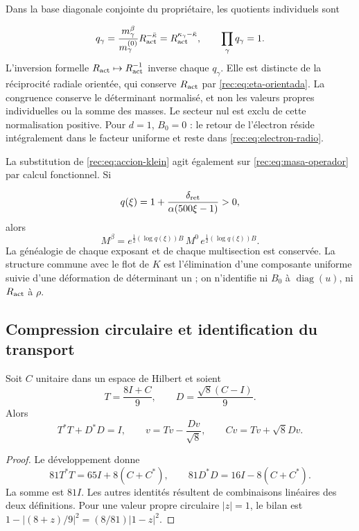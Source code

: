 Dans la base diagonale conjointe du propriétaire, les quotients individuels sont

\[
 q_\gamma=\frac{m_\gamma^\beta}{m_\gamma^{(0)}}R_{\rm act}^{-\bar\kappa}
 =R_{\rm act}^{\kappa_\gamma-\bar\kappa},\qquad
 \prod_\gamma q_\gamma=1.
\]
L’inversion formelle \(R_{\rm act}\mapsto R_{\rm act}^{-1}\) inverse chaque \(q_\gamma\). Elle est distincte de la réciprocité radiale orientée, qui conserve \(R_{\rm act}\) par \eqref{rec:eq:eta-orientada}. La congruence conserve le déterminant normalisé, et non les valeurs propres individuelles ou la somme des masses. Le secteur nul est exclu de cette normalisation positive. Pour \(d=1\), \(B_0=0\) : le retour de l’électron réside intégralement dans le facteur uniforme et reste dans \eqref{rec:eq:electron-radio}.

La substitution de \eqref{rec:eq:accion-klein} agit également sur \eqref{rec:eq:masa-operador} par calcul fonctionnel. Si

\[
 q(\xi)=1+\frac{\delta_{\rm ret}}{\alpha(500\xi-1)}>0,
\]
alors
\[
 M^\beta=e^{\frac12(\log q(\xi))B}\,M^0\,
          e^{\frac12(\log q(\xi))B}.
\]
La généalogie de chaque exposant et de chaque multisection est conservée. La structure commune avec le flot de \(K\) est l’élimination d’une composante uniforme suivie d’une déformation de déterminant un ; on n’identifie ni \(B_0\) à \(\operatorname{diag}(u)\), ni \(R_{\rm act}\) à \(\rho\).


\subsection{Compression circulaire et identification du transport}

\begin{theorem}
\label{rec:thm:operador}
Soit \(C\) unitaire dans un espace de Hilbert et soient
\[
 T=\frac{8I+C}{9},\qquad D=\frac{\sqrt8(C-I)}9.
\]
Alors
\begin{equation}
 T^*T+D^*D=I,\qquad
 v=Tv-\frac{Dv}{\sqrt8},\qquad Cv=Tv+\sqrt8Dv.
 \label{rec:eq:unitario}
\end{equation}
\end{theorem}
\begin{proof}
Le développement donne
\[
 81T^*T=65I+8(C+C^*),\qquad
 81D^*D=16I-8(C+C^*).
\]
La somme est \(81I\). Les autres identités résultent de combinaisons linéaires des deux définitions. Pour une valeur propre circulaire \(|z|=1\), le bilan est \(1-|(8+z)/9|^2=(8/81)|1-z|^2\).
\end{proof}

